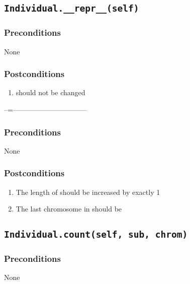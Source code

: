 \documentclass[letterpaper,10pt,english]{sphinxmanual}
\begin{document}
\subsection{\texttt{Individual.\_\_repr\_\_(self)}}
\label{contracts:individual-repr-self}

\subsubsection{Preconditions}
\label{contracts:id11}
None


\subsubsection{Postconditions}
\label{contracts:id12}\begin{enumerate}
\item {} 
 should not be changed

\end{enumerate}

--=--------------------------------


\subsubsection{Preconditions}
\label{contracts:id13}
None


\subsubsection{Postconditions}
\label{contracts:id14}\begin{enumerate}
\item {} 
The length of  should be increased by exactly 1

\item {} 
The last chromosome in  should be 

\end{enumerate}


\subsection{\texttt{Individual.count(self, sub, chrom)}}
\label{contracts:individual-count-self-sub-chrom}

\subsubsection{Preconditions}
\label{contracts:id15}
None
\end{document}
